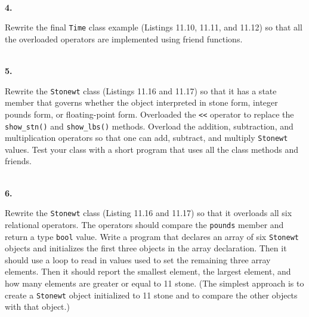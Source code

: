 \documentclass[10 pt]{amsart}
\newlength{\cwidth}
\newenvironment{cpart}[2][\cwidth]
	{%
		\\ %
		\textbf{#2. }%
		\begin{minipage}[t]{#1}%
		\setlength{\parindent}{0pt}%
		\setlength{\parskip}{2ex}%
	}
	{%
		\end{minipage}%
	}
\newcommand{\ttt}[1]{\texttt{#1}}
\begin{document}
	\begin{cpart}{4}
		Rewrite the final \ttt{Time} class example (Listings 11.10, 
		11.11, and 11.12) so that all the overloaded operators are
		implemented using friend functions.
	\end{cpart}

	\begin{cpart}{5}
		Rewrite the \ttt{Stonewt} class (Listings 11.16 and 11.17)
		so that it has a state member that governs whether the object
		interpreted in stone form, integer pounds form, or floating-point
		form. 
		Overloaded the \ttt{<<} operator to replace the \ttt{show\_stn()}
		and \ttt{show\_lbs()} methods.
		Overload the addition, subtraction, and multiplication 
		operators so that one can add, subtract, and multiply 
		\ttt{Stonewt} values.
		Test your class with a short program that uses all the class
		methods and friends.
	\end{cpart}

	\begin{cpart}{6}
		Rewrite the \ttt{Stonewt} class (Listing 11.16 and 11.17)
		so that it overloads all six relational operators.
		The operators should compare the \ttt{pounds} member and 
		return a type \ttt{bool} value.
		Write a program that declares an array of six \ttt{Stonewt}
		objects and initializes the first three objects in the
		array declaration.
		Then it should use a loop to read in values used to set the
		remaining three array elements.
		Then it should report the smallest element, the largest
		element, and how many elements are greater or equal to
		11 stone.
		(The simplest approach is to create a \ttt{Stonewt} object
		initialized to 11 stone and to compare the other objects with
		that object.)
	\end{cpart}
\end{document}
